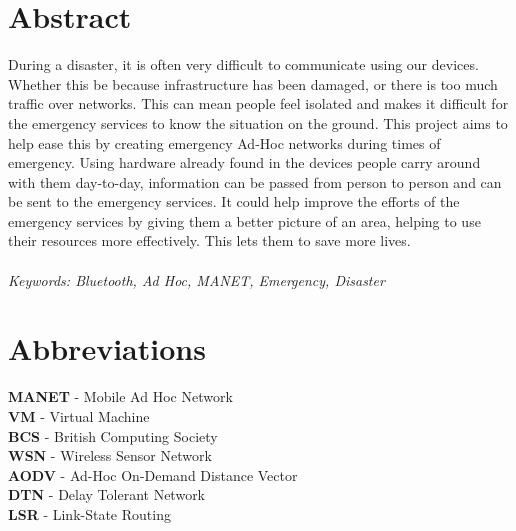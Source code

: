 \documentclass{report}
\begin{document}
\chapter*{Abstract}

During a disaster, it is often very difficult to communicate using our devices. Whether this be because 
infrastructure has been damaged, or there is too much traffic over networks. This can mean people feel 
isolated and makes it difficult for the emergency services to know the situation on the ground. This 
project aims to help ease this by creating emergency Ad-Hoc networks during times of emergency. Using 
hardware already found in the devices people carry around with them day-to-day, information can be 
passed from person to person and can be sent to the emergency services. It could help improve the efforts of the emergency services by giving them a better picture of an area, helping to use their resources more effectively. This lets them to save more lives.
\\
\\
\textit{Keywords: Bluetooth, Ad Hoc, MANET, Emergency, Disaster}



\chapter*{Abbreviations}

\textbf{MANET} - Mobile Ad Hoc Network\\
\textbf{VM} - Virtual Machine\\
\textbf{BCS} - British Computing Society\\
\textbf{WSN} - Wireless Sensor Network\\
\textbf{AODV} - Ad-Hoc On-Demand Distance Vector\\
\textbf{DTN} - Delay Tolerant Network\\
\textbf{LSR} - Link-State Routing\\



\tableofcontents{}     
\end{document}
